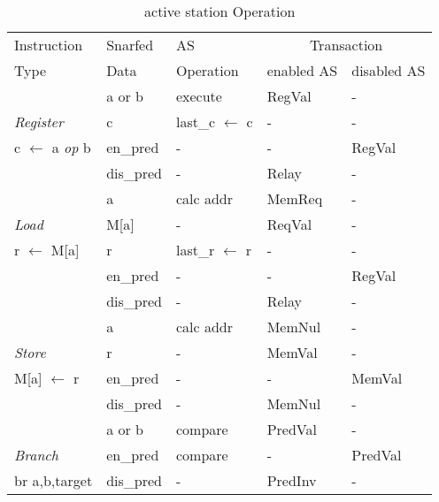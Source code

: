 \documentclass[10pt,twocolumn]{IEEEtran}
\begin{document}
\begin{table}
\begin{center}
\caption{active station Operation} \label{tab:asop} \scriptsize{
\begin{tabular}{|l|l||l|l|l|}

\hline Instruction & Snarfed & AS &
\multicolumn{2}{c|}{Transaction}\\ \cline{4-5}
Type & Data & Operation & enabled AS & disabled AS \\
\hline

 & a or b & execute & RegVal & - \\
 \emph{Register} & c & last\_c $\leftarrow$ c & - & -\\
 c $\leftarrow$ a \emph{op} b & en\_pred & - & - & RegVal \\
 & dis\_pred & - & Relay & - \\

 \hline

 & a & calc addr & MemReq & - \\
 \emph{Load} & M[a] & - & ReqVal & - \\
 r $\leftarrow$ M[a] & r & last\_r $\leftarrow$ r & - & -\\
 & en\_pred & - & - & RegVal \\
 & dis\_pred & - & Relay & - \\

 \hline

 & a & calc addr & MemNul & - \\
 \emph{Store} & r & - & MemVal & - \\
 M[a] $\leftarrow$ r & en\_pred & - & - & MemVal \\
 & dis\_pred & - & MemNul & - \\

 \hline

 & a or b & compare & PredVal & - \\
 \emph{Branch} & en\_pred & compare & - & PredVal \\
 br a,b,target & dis\_pred & - & PredInv & - \\

\hline

\end{tabular}
}
\end{center}
\end{table}
%

%
%
\end{document}
